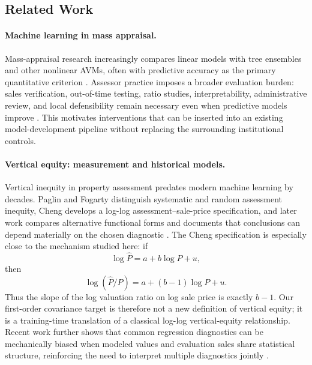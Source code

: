 \documentclass[10pt]{article}
\theoremstyle{definition}
\newcommand{\1}{\mathbf{1}}
\begin{document}
\subsection{Related Work}
\label{subsec:related_work}

\paragraph{Machine learning in mass appraisal.}
Mass-appraisal research increasingly compares linear models with tree ensembles and other nonlinear AVMs, often with predictive accuracy as the primary quantitative criterion \cite{WangLi2019,Rootetal2023,Sevgen2024100111,Zilli2024,purdueAssessingTechniques}. Assessor practice imposes a broader evaluation burden: sales verification, out-of-time testing, ratio studies, interpretability, administrative review, and local defensibility remain necessary even when predictive models improve \cite{IAAO2020SalesVerification,IAAOAITaskForce2022,BidansetRakow2022}. This motivates interventions that can be inserted into an existing model-development pipeline without replacing the surrounding institutional controls.

\paragraph{Vertical equity: measurement and historical models.}
Vertical inequity in property assessment predates modern machine learning by decades. Paglin and Fogarty distinguish systematic and random assessment inequity, Cheng develops a log-log assessment--sale-price specification, and later work compares alternative functional forms and documents that conclusions can depend materially on the chosen diagnostic \cite{PaglinFogarty1972,Cheng1974,Edelstein1979,SundermanEtAl1990}. The Cheng specification is especially close to the mechanism studied here: if
\[
\log \widehat P = a+b\log P+u,
\]
then
\[
\log(\widehat P/P)=a+(b-1)\log P+u.
\]
Thus the slope of the log valuation ratio on log sale price is exactly $b-1$. Our first-order covariance target is therefore not a new definition of vertical equity; it is a training-time translation of a classical log-log vertical-equity relationship. Recent work further shows that common regression diagnostics can be mechanically biased when modeled values and evaluation sales share statistical structure, reinforcing the need to interpret multiple diagnostics jointly \cite{McMillenSingh2023,IAAO2023VerticalReview}.
\end{document}
